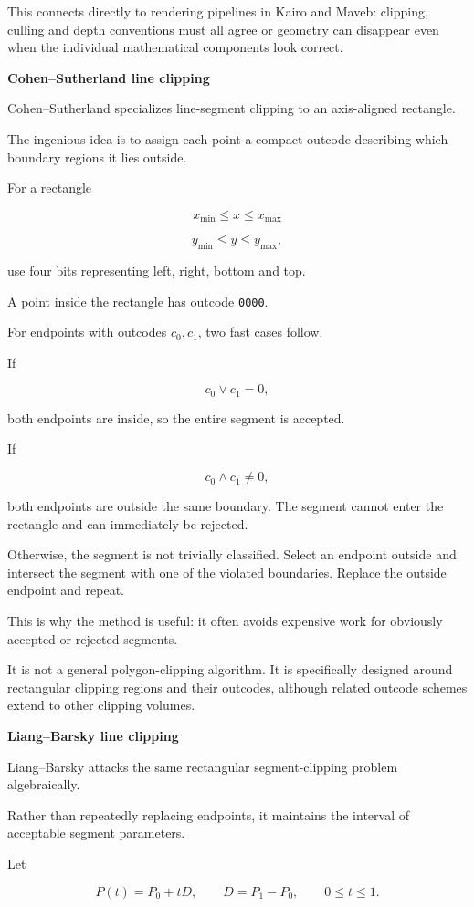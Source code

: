 This connects directly to rendering pipelines in Kairo and Maveb: clipping, culling and depth conventions must all agree or geometry can disappear even when the individual mathematical components look correct.

\textbf{Cohen--Sutherland line clipping}

Cohen--Sutherland specializes line-segment clipping to an axis-aligned rectangle.

The ingenious idea is to assign each point a compact outcode describing which boundary regions it lies outside.

For a rectangle

\[
x_{\min}\le x\le x_{\max}
\]

\[
y_{\min}\le y\le y_{\max},
\]

use four bits representing left, right, bottom and top.

A point inside the rectangle has outcode \texttt{0000}.

For endpoints with outcodes \(c_0,c_1\), two fast cases follow.

If

\[
c_0\lor c_1=0,
\]

both endpoints are inside, so the entire segment is accepted.

If

\[
c_0\land c_1\ne0,
\]

both endpoints are outside the same boundary. The segment cannot enter the rectangle and can immediately be rejected.

Otherwise, the segment is not trivially classified. Select an endpoint outside and intersect the segment with one of the violated boundaries. Replace the outside endpoint and repeat.

This is why the method is useful: it often avoids expensive work for obviously accepted or rejected segments.

It is not a general polygon-clipping algorithm. It is specifically designed around rectangular clipping regions and their outcodes, although related outcode schemes extend to other clipping volumes.

\textbf{Liang--Barsky line clipping}

Liang--Barsky attacks the same rectangular segment-clipping problem algebraically.

Rather than repeatedly replacing endpoints, it maintains the interval of acceptable segment parameters.

Let

\[
P(t)=P_0+tD,\qquad D=P_1-P_0,\qquad 0\le t\le1.
\]

